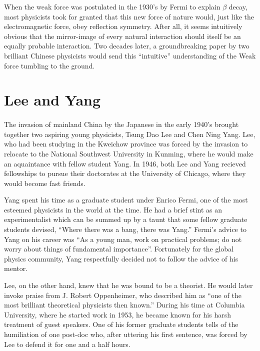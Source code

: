 \documentclass[a4paper,12pt]{book}
\begin{document}
When the weak force was postulated in the 1930's by Fermi to explain $\beta$ decay, most physicists took for granted that this new force of nature would, just like the electromagnetic force, obey reflection symmetry. After all, it seems intuitively obvious that the mirror-image of every natural interaction should itself be an equally probable interaction. Two decades later, a groundbreaking paper by two brilliant Chinese physicists would send this ``intuitive'' understanding of the Weak force tumbling to the ground.

\section{Lee and Yang}

\paragraph*{}The invasion of mainland China by the Japanese in the early 1940's brought together two aspiring young physicists, Tsung Dao Lee and Chen Ning Yang. Lee, who had been studying in the Kweichow province was forced by the invasion to relocate to the National Southwest University in Kunming, where he would make an aquaintance with fellow student Yang. In 1946, both Lee and Yang recieved fellowships to pursue their doctorates at the University of Chicago, where they would become fast friends.

Yang spent his time as a graduate student under Enrico Fermi, one of the most esteemed physicists in the world at the time. He had a brief stint as an experimentalist which can be summed up by a taunt that some fellow graduate students devised, ``Where there was a bang, there was Yang.''\cite{bernstein} Fermi's advice to Yang on his career was ``As a young man, work on practical problems; do not worry about things of fundamental importance''\cite{segre}. Fortunately for the global physics community, Yang respectfully decided not to follow the advice of his mentor.

Lee, on the other hand, knew that he was bound to be a theorist. He would later invoke praise from J. Robert Oppenheimer, who described him as ``one of the most brilliant theoretical physicists then known.''\cite{nobel} During his time at Columbia University, where he started work in 1953, he became known for his harsh treatment of guest speakers. One of his former graduate students tells of the humiliation of one post-doc who, after uttering his first sentence, was forced by Lee to defend it for one and a half hours\cite{derman}.
\end{document}
